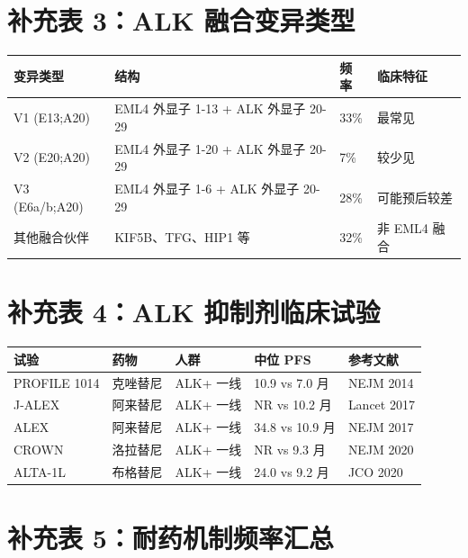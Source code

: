 \documentclass[12pt,a4paper]{article}
\begin{document}
\newpage

\section{补充表 3：ALK 融合变异类型}

\begin{table}[h]
\centering
\begin{tabular}{p{3cm}p{3cm}p{2cm}p{4cm}}
\toprule
\textbf{变异类型} & \textbf{结构} & \textbf{频率} & \textbf{临床特征} \\
\midrule
V1 (E13;A20) & EML4 外显子 1-13 + ALK 外显子 20-29 & 33\% & 最常见 \\
V2 (E20;A20) & EML4 外显子 1-20 + ALK 外显子 20-29 & 7\% & 较少见 \\
V3 (E6a/b;A20) & EML4 外显子 1-6 + ALK 外显子 20-29 & 28\% & 可能预后较差 \\
其他融合伙伴 & KIF5B、TFG、HIP1 等 & 32\% & 非 EML4 融合 \\
\bottomrule
\end{tabular}
\end{table}

\newpage

\section{补充表 4：ALK 抑制剂临床试验}

\begin{table}[h]
\centering
\begin{tabular}{p{2cm}p{2cm}p{2.5cm}p{2.5cm}p{2cm}}
\toprule
\textbf{试验} & \textbf{药物} & \textbf{人群} & \textbf{中位 PFS} & \textbf{参考文献} \\
\midrule
PROFILE 1014 & 克唑替尼 & ALK+ 一线 & 10.9 vs 7.0 月 & NEJM 2014 \\
J-ALEX & 阿来替尼 & ALK+ 一线 & NR vs 10.2 月 & Lancet 2017 \\
ALEX & 阿来替尼 & ALK+ 一线 & 34.8 vs 10.9 月 & NEJM 2017 \\
CROWN & 洛拉替尼 & ALK+ 一线 & NR vs 9.3 月 & NEJM 2020 \\
ALTA-1L & 布格替尼 & ALK+ 一线 & 24.0 vs 9.2 月 & JCO 2020 \\
\bottomrule
\end{tabular}
\end{table}

\newpage

\section{补充表 5：耐药机制频率汇总}
\end{document}
